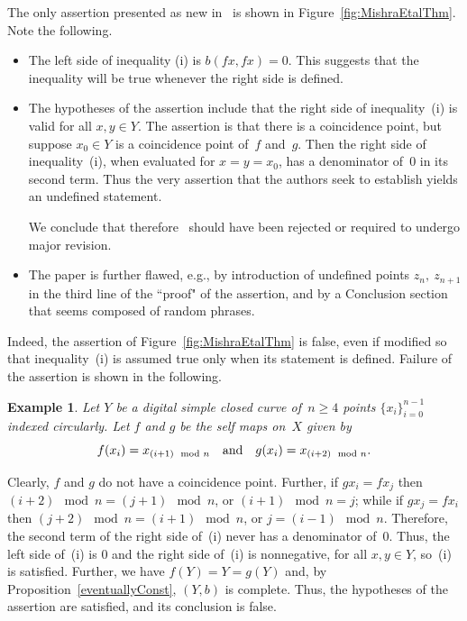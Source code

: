\documentclass{article}
\newtheorem{exl}[thm]{Example}
\numberwithin{thm}{section}
\begin{document}
The only assertion presented as new 
in~\cite{MishraEtal} is shown
in Figure~\ref{fig:MishraEtalThm}. Note
the following.
\begin{itemize}
    \item The left side of inequality (i) is
        $b(fx, fx) = 0$. This suggests that
        the inequality will be true whenever
        the right side is defined.
    \item The hypotheses of the assertion 
    include that the right side of 
    inequality~(i) is valid for all 
    $x,y \in Y$. The assertion is that there
          is a coincidence point, but suppose
          $x_0 \in Y$ is a coincidence point
          of~$f$ and~$g$. Then the right
          side of inequality~(i), when 
          evaluated for $x=y=x_0$, has a 
          denominator of~$0$ in its second
          term. Thus the very assertion that
          the authors seek to establish
          yields an undefined statement.
          
          We conclude that 
          therefore~\cite{MishraEtal}
          should have been rejected or 
          required to undergo major revision.
    \item The paper is further flawed, e.g.,
          by introduction of undefined points $z_n,~z_{n+1}$ in the third line
          of the ``proof" of the assertion,
          and by a Conclusion section that
          seems composed of random phrases.   
\end{itemize}

Indeed, the assertion of
Figure~\ref{fig:MishraEtalThm} is false, even
if modified so that inequality~(i) is
assumed true only when its statement is
defined. Failure of the assertion is shown in 
the following.

\begin{exl}
Let $Y$ be a digital simple closed curve 
of~$n \ge 4$ points $\{x_i\}_{i=0}^{n-1}$ 
indexed circularly. Let $f$ and $g$ be the
self maps on~$X$ given by
\[ f(x_i)= x_{(i+1) \mod n}~~~\mbox{\rm and}~~~
g(x_i) = x_{(i+2) \mod n}.
\]
\end{exl}
Clearly, $f$ and $g$ do not have a coincidence
point. Further, if $gx_i = fx_j$ then 
$(i+2) \mod n = (j+1) \mod n$, or 
$(i+1) \mod n =j$; while if $gx_j = fx_i$
then $(j+2) \mod n = (i+1) \mod n$, or
$j = (i-1) \mod n$. Therefore, the second
term of the right side of~(i)
never has a denominator of~$0$. Thus, 
the left side of~(i) is $0$
and the right side of~(i)
is nonnegative, for all $x,y \in Y$,
so~(i) is satisfied. Further, we have
$f(Y)=Y=g(Y)$ and, by 
Proposition~\ref{eventuallyConst},
$(Y,b)$ is complete. Thus, the hypotheses
of the assertion are satisfied, and its
conclusion is false.
\end{document}
